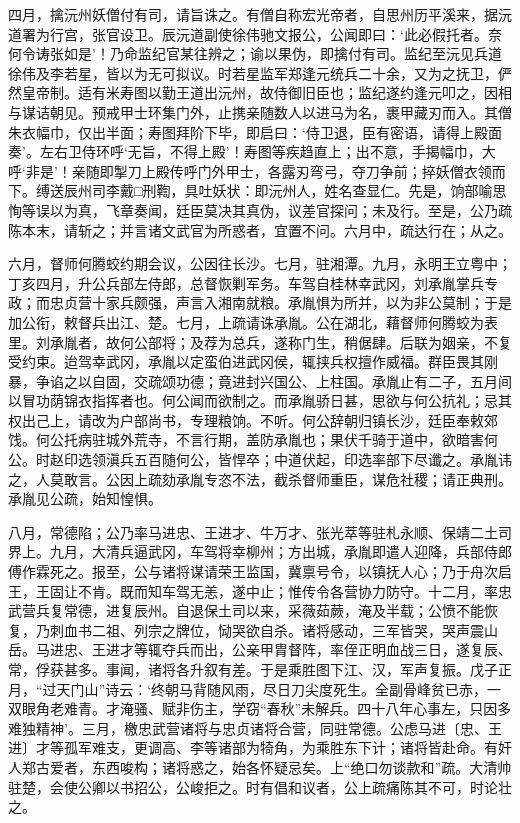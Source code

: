 \documentclass[]{article}
\begin{document}
四月，擒沅州妖僧付有司，请旨诛之。有僧自称宏光帝者，自思州历平溪来，据沅道署为行宫，张官设卫。辰沅道副使徐伟驰文报公，公闻即曰：`此必假托者。奈何令诪张如是'！乃命监纪官某往辨之；谕以果伪，即擒付有司。监纪至沅见兵道徐伟及李若星，皆以为无可拟议。时若星监军郑逢元统兵二十余，又为之抚卫，俨然皇帝制。适有米寿图以勤王道出沅州，故侍御旧臣也；监纪遂约逢元叩之，因相与谋诘朝见。预戒甲士环集门外，止携亲随数人以进马为名，裹甲藏刃而入。其僧朱衣幅巾，仅出半面；寿图拜阶下毕，即启曰：`侍卫退，臣有密语，请得上殿面奏'。左右卫侍环呼`无旨，不得上殿'！寿图等疾趋直上；出不意，手揭幅巾，大呼`非是'！亲随即掣刀上殿传呼门外甲士，各露刃弯弓，夺刀争前；捽妖僧衣领而下。缚送辰州司李戴□刑鞫，具吐妖状：即沅州人，姓名查显仁。先是，饷部喻思恂等误以为真，飞章奏闻，廷臣莫决其真伪，议差官探问；未及行。至是，公乃疏陈本末，请斩之；并言诸文武官为所惑者，宜置不问。六月中，疏达行在；从之。

六月，督师何腾蛟约期会议，公因往长沙。七月，驻湘潭。九月，永明王立粤中；丁亥四月，升公兵部左侍郎，总督恢剿军务。车驾自桂林幸武冈，刘承胤掌兵专政；而忠贞营十家兵颇强，声言入湘南就粮。承胤惧为所并，以为非公莫制；于是加公衔，敕督兵出江、楚。七月，上疏请诛承胤。公在湖北，藉督师何腾蛟为表里。刘承胤者，故何公部将；及荐为总兵，遂称门生，稍倨肆。后联为姻亲，不复受约束。迨驾幸武冈，承胤以定蛮伯进武冈侯，辄挟兵权擅作威福。群臣畏其刚暴，争谄之以自固，交疏颂功德；竟进封兴国公、上柱国。承胤止有二子，五月间以冒功荫锦衣指挥者也。何公闻而欲制之。而承胤骄日甚，思欲与何公抗礼；忌其权出己上，请改为户部尚书，专理粮饷。不听。何公辞朝归镇长沙，廷臣奉敕郊饯。何公托病驻城外荒寺，不言行期，盖防承胤也；果伏千骑于道中，欲暗害何公。时赵印选领滇兵五百随何公，皆悍卒；中道伏起，印选率部下尽谶之。承胤讳之，人莫敢言。公因上疏劾承胤专恣不法，截杀督师重臣，谋危社稷；请正典刑。承胤见公疏，始知惶惧。

八月，常德陷；公乃率马进忠、王进才、牛万才、张光萃等驻札永顺、保靖二土司界上。九月，大清兵逼武冈，车驾将幸柳州；方出城，承胤即遣人迎降，兵部侍郎傅作霖死之。报至，公与诸将谋请荣王监国，冀禀号令，以镇抚人心；乃于舟次启王，王固让不肯。既而知车驾无恙，遂中止；惟传令各营协力防守。十二月，率忠武营兵复常德，进复辰州。自退保土司以来，采薇茹蕨，淹及半载；公愤不能恢复，乃刺血书二祖、列宗之牌位，恸哭欲自杀。诸将感动，三军皆哭，哭声震山岳。马进忠、王进才等辄夺兵而出，公亲甲胄督阵，率侄正明血战三日，遂复辰、常，俘获甚多。事闻，诸将各升叙有差。于是乘胜图下江、汉，军声复振。戊子正月，``过天门山''诗云：`终朝马背随风雨，尽日刀尖度死生。全副骨峰贫已赤，一双眼角老难青。才淹骚、赋非伤主，学窃``春秋''未解兵。四十八年心事左，只因多难独精神'。三月，檄忠武营诸将与忠贞诸将合营，同驻常德。公虑马进〔忠、王进〕才等孤军难支，更调高、李等诸部为犄角，为乘胜东下计；诸将皆赴命。有奸人郑古爱者，东西唆构；诸将惑之，始各怀疑忌矣。上``绝口勿谈款和''疏。大清帅驻楚，会使公卿以书招公，公峻拒之。时有倡和议者，公上疏痛陈其不可，时论壮之。
\end{document}
